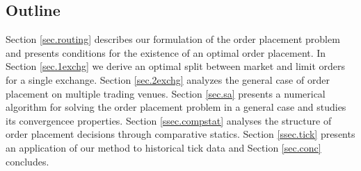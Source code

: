 \documentclass[opre,nonblindrev]{informs3}
\begin{document}
\subsection{Outline}

Section \ref{sec.routing} describes our formulation of the order placement problem and presents conditions for the existence of an optimal order placement. In Section \ref{sec.1exchg} we derive an optimal split between market and limit orders for a single exchange. Section \ref{sec.2exchg}  analyzes the general case of order placement on multiple trading venues. Section \ref{sec.sa} presents a numerical algorithm for solving the order placement problem in a general case and studies its convergencee properties. Section \ref{ssec.compstat} analyses the structure of order placement decisions through comparative statics. Section \ref{ssec.tick} presents an application of our method to historical tick data and Section \ref{sec.conc} concludes.


\end{document}
